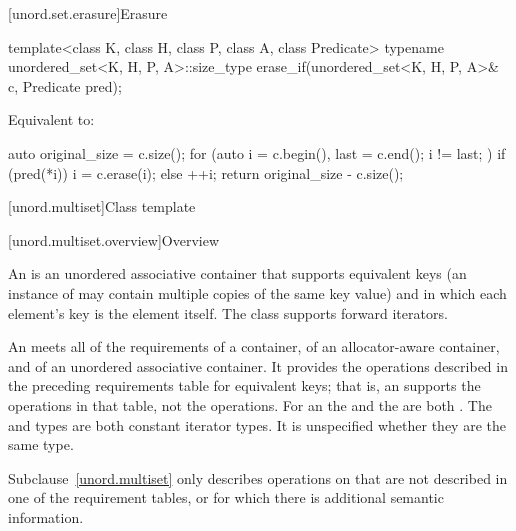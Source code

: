 [unord.set.erasure]{Erasure}

%
\begin{itemdecl}
template<class K, class H, class P, class A, class Predicate>
  typename unordered_set<K, H, P, A>::size_type
    erase_if(unordered_set<K, H, P, A>& c, Predicate pred);
\end{itemdecl}

\begin{itemdescr}
\pnum
\effects
Equivalent to:
\begin{codeblock}
auto original_size = c.size();
for (auto i = c.begin(), last = c.end(); i != last; ) {
  if (pred(*i)) {
    i = c.erase(i);
  } else {
    ++i;
  }
}
return original_size - c.size();
\end{codeblock}
\end{itemdescr}

[unord.multiset]{Class template }%

[unord.multiset.overview]{Overview}

\pnum
{}%
%
An  is an unordered associative container
that supports equivalent keys (an instance of  may contain
multiple copies of the same key value) and in which each element's key
is the element itself.
The  class
supports forward iterators.

\pnum
An  meets all of the requirements
of a container,
of an allocator-aware container, and
of an unordered associative container.
It provides the operations described in the
preceding requirements table for equivalent keys; that is, an 
supports the  operations in that table, not the  operations.
For an  the  and the  are
both . The  and  types are both
constant iterator types. It is unspecified whether they are the same type.

\pnum
Subclause~\ref{unord.multiset} only describes operations on  that
are not described in one of the requirement tables, or for which there
is additional semantic information.


